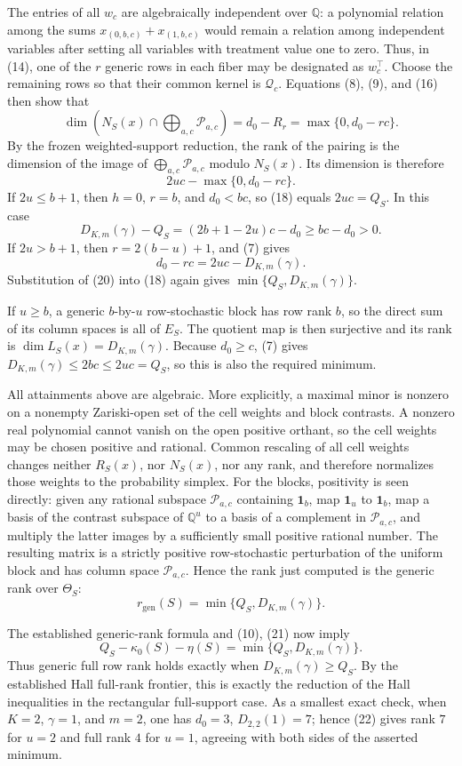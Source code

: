 The entries of all \(w_c\) are algebraically independent over \(\mathbb Q\): a
polynomial relation among the sums
\(x_{(0,b,c)}+x_{(1,b,c)}\) would remain a relation among independent variables
after setting all variables with treatment value one to zero.  Thus, in (14),
one of the \(r\) generic rows in each fiber may be designated as \(w_c^\top\).
Choose the remaining rows so that their common kernel is
\(\mathscr Q_c\).  Equations (8), (9), and (16) then show that
\[
\dim\left(
N_S(x)\cap\bigoplus_{a,c}\mathscr P_{a,c}
\right)
=d_0-R_r
=\max\{0,d_0-rc\}.
\tag{17}
\]
By the frozen weighted-support reduction, the rank of the pairing is the
dimension of the image of \(\bigoplus_{a,c}\mathscr P_{a,c}\) modulo
\(N_S(x)\).  Its dimension is therefore
\[
2uc-\max\{0,d_0-rc\}.
\tag{18}
\]
If \(2u\le b+1\), then \(h=0\), \(r=b\), and \(d_0<bc\), so (18) equals
\(2uc=Q_S\).  In this case
\[
D_{K,m}(\gamma)-Q_S
=(2b+1-2u)c-d_0\ge bc-d_0>0.
\tag{19}
\]
If \(2u>b+1\), then \(r=2(b-u)+1\), and (7) gives
\[
d_0-rc=2uc-D_{K,m}(\gamma).
\tag{20}
\]
Substitution of (20) into (18) again gives
\(\min\{Q_S,D_{K,m}(\gamma)\}\).

If \(u\ge b\), a generic \(b\)-by-\(u\) row-stochastic block has row rank
\(b\), so the direct sum of its column spaces is all of \(E_S\).  The quotient
map is then surjective and its rank is \(\dim L_S(x)=D_{K,m}(\gamma)\).  Because
\(d_0\ge c\), (7) gives \(D_{K,m}(\gamma)\le2bc\le2uc=Q_S\), so this is also
the required minimum.

All attainments above are algebraic.  More explicitly, a maximal minor is
nonzero on a nonempty Zariski-open set of the cell weights and block contrasts.
A nonzero real polynomial cannot vanish on the open positive orthant, so the
cell weights may be chosen positive and rational.  Common rescaling of all cell
weights changes neither \(R_S(x)\), nor \(N_S(x)\), nor any rank, and therefore
normalizes those weights to the probability simplex.  For the blocks, positivity
is seen directly: given any rational subspace \(\mathscr P_{a,c}\) containing
\(\mathbf 1_b\), map \(\mathbf 1_u\) to \(\mathbf 1_b\), map a basis of the
contrast subspace of \(\mathbb Q^u\) to a basis of a complement in
\(\mathscr P_{a,c}\), and multiply the latter images by a sufficiently small
positive rational number.  The resulting matrix is a strictly positive
row-stochastic perturbation of the uniform block and has column space
\(\mathscr P_{a,c}\).  Hence the rank just computed is the generic rank over
\(\Theta_S\):
\[
r_{\mathrm{gen}}(S)=\min\{Q_S,D_{K,m}(\gamma)\}.
\tag{21}
\]

The established generic-rank formula and (10), (21) now imply
\[
Q_S-\kappa_0(S)-\eta(S)
=\min\{Q_S,D_{K,m}(\gamma)\}.
\tag{22}
\]
Thus generic full row rank holds exactly when
\(D_{K,m}(\gamma)\ge Q_S\).  By the established Hall full-rank frontier, this is
exactly the reduction of the Hall inequalities in the rectangular full-support
case.  As a smallest exact check, when \(K=2\), \(\gamma=1\), and \(m=2\), one
has \(d_0=3\), \(D_{2,2}(1)=7\); hence (22) gives rank \(7\) for \(u=2\) and
full rank \(4\) for \(u=1\), agreeing with both sides of the asserted minimum.
